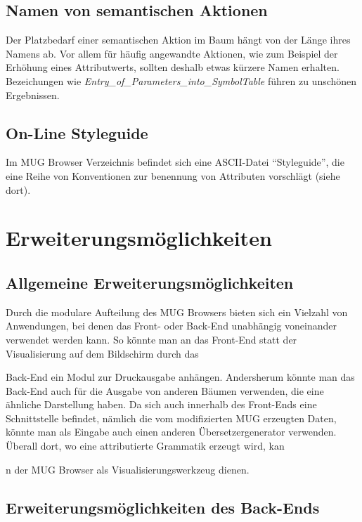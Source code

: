 \section{Namen von semantischen Aktionen}

Der Platzbedarf einer semantischen Aktion im Baum h\"angt von der L\"ange ihres Namens ab. Vor allem f\"ur h\"aufig angewandte Aktionen, wie zum Beispiel
der Erh\"ohung eines Attributwerts, sollten deshalb etwas k\"urzere Namen erhalten. Bezeichungen wie {\it Entry\_of\_Parameters\_into\_SymbolTable} f\"uhren
zu unsch\"onen Ergebnissen.

\section{On-Line Styleguide}

Im MUG Browser Verzeichnis befindet sich eine ASCII-Datei "`Styleguide"', die eine Reihe von Konventionen zur benennung von Attributen vorschl\"agt
(siehe dort).

\chapter{Erweiterungsm\"oglichkeiten}

\section{Allgemeine Erweiterungsm\"oglichkeiten}

Durch die modulare Aufteilung des MUG Browsers bieten sich ein Vielzahl von Anwendungen, bei denen das Front- oder Back-End unabh\"angig voneinander verwendet werden kann. So k\"onnte man an das Front-End statt der Visualisierung auf dem Bildschirm durch das



 Back-End ein Modul zur Druckausgabe anh\"angen. Andersherum k\"onnte man das Back-End auch f\"ur die Ausgabe von anderen B\"aumen verwenden, die eine \"ahnliche Darstellung haben.
Da sich auch innerhalb des Front-Ends eine Schnittstelle befindet, n\"amlich die vom modifizierten MUG erzeugten Daten, k\"onnte man als Eingabe auch einen anderen \"Ubersetzergenerator verwenden. \"Uberall dort, wo eine attributierte Grammatik erzeugt wird, kan



n der MUG Browser als Visualisierungswerkzeug dienen.

\section{Erweiterungsm\"oglichkeiten des Back-Ends}

